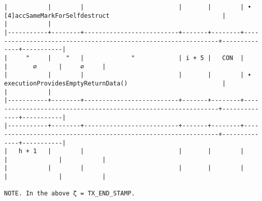 \documentclass[varwidth=\maxdimen,margin=0.5cm,multi={verbatim}]{standalone}
\begin{document}
\begin{verbatim}
|           |        |                          |       |        | • [4]accSameMarkForSelfdestruct                               |              |           |
|-----------+--------+--------------------------+-------+--------+---------------------------------------------------------------+--------------+-----------|
|     "     |    "   |             "            | i + 5 |   CON  |                                                               |       ∅      |     ∅     |
|           |        |                          |       |        | ∙ executionProvidesEmptyReturnData()                          |              |           |
|-----------+--------+--------------------------+-------+--------+---------------------------------------------------------------+--------------+-----------|
|-----------+--------+--------------------------+-------+--------+---------------------------------------------------------------+--------------+-----------|
|   h + 1   |        |                          |       |        |                                                               |              |           |
|           |        |                          |       |        |                                                               |              |           |

NOTE. In the above ζ = TX_END_STAMP. 
\end{verbatim}
\end{document}
